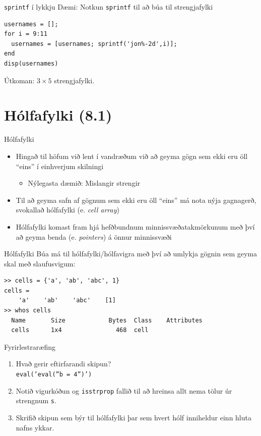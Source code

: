 \documentclass{beamer}
\begin{document}
\begin{frame}[fragile]{\texttt{sprintf} í lykkju}
Dæmi: Notkun \texttt{sprintf} til að búa til strengjafylki

\begin{verbatim}
usernames = [];
for i = 9:11
  usernames = [usernames; sprintf('jon%-2d',i)];
end
disp(usernames)
\end{verbatim}
Útkoman: $3\times 5$ strengjafylki.
\end{frame}

\section{Hólfafylki (8.1)}

\begin{frame}{Hólfafylki}
\begin{itemize}
 \item Hingað til höfum við lent í vandræðum við að geyma gögn sem ekki eru öll ``eins'' í einhverjum skilningi
 \begin{itemize}
  \item Nýlegasta dæmið: Mislangir strengir
 \end{itemize}
 \item Til að geyma safn af gögnum sem ekki eru öll ``eins'' má nota nýja gagnagerð, svokallað hólfafylki (e. \emph{cell array})
 \item Hólfafylki komast fram hjá hefðbundnum minnissvæðatakmörkunum með því að geyma benda (e. \emph{pointers}) á önnur minnissvæði
\end{itemize}
\end{frame}

\begin{frame}[fragile]{Hólfafylki}
Búa má til hólfafylki/hólfavigra með því að umlykja gögnin sem geyma skal með slaufusvigum:

\begin{verbatim}
>> cells = {'a', 'ab', 'abc', 1}
cells = 
    'a'    'ab'    'abc'    [1]
>> whos cells
  Name       Size            Bytes  Class    Attributes
  cells      1x4               468  cell
\end{verbatim}
\end{frame}

\begin{frame}{Fyrirlestraræfing}
\begin{enumerate}
 \item Hvað gerir eftirfarandi skipun?\\
 \texttt{eval('eval(''b = 4'')')}
 \item Notið vigurkóðun og \texttt{isstrprop} fallið til að hreinsa allt nema tölur úr strengnum \texttt{s}.
 \item Skrifið skipun sem býr til hólfafylki þar sem hvert hólf inniheldur einn hluta nafns ykkar.
\end{enumerate}
\end{frame}
\end{document}
